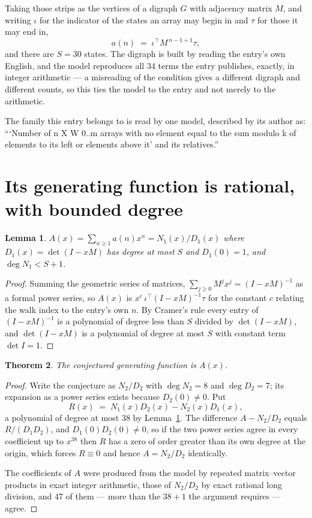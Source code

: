 \documentclass[11pt,a4paper]{article}
\theoremstyle{plain}
\newtheorem{theorem}{Theorem}
\newtheorem{lemma}[theorem]{Lemma}
\theoremstyle{definition}
\begin{document}
Taking those strips as the vertices of a digraph $G$ with adjacency matrix $M$, and writing
$\iota$ for the indicator of the states an array may begin in and $\tau$ for those it may end
in,
\[
a(n)\;=\;\iota^{\!\top}M^{\,n-1+1}\tau ,
\]
and there are $S=30$ states. The digraph is built by reading the entry's own English, and the
model reproduces all $34$ terms the entry publishes, exactly, in integer arithmetic --- a
misreading of the condition gives a different digraph and different counts, so this ties the
model to the entry and not merely to the arithmetic.

The family this entry belongs to is read by one model, described by its author as: ```Number of n X W 0..m arrays with no element equal to the sum modulo k of elements to its left or elements above it' and its relatives.''


\section{Its generating function is rational, with bounded degree}

\begin{lemma}\label{lem:rat}
$A(x)=\sum_{n\ge1}a(n)x^n=N_1(x)/D_1(x)$ where $D_1(x)=\det(I-xM)$ has degree at most
$S$ and $D_1(0)=1$, and $\deg N_1<S+1$.
\end{lemma}

\begin{proof}
Summing the geometric series of matrices, $\sum_{j\ge0}M^jx^j=(I-xM)^{-1}$ as a formal
power series, so $A(x)$ is $x^{c}\,\iota^{\!\top}(I-xM)^{-1}\tau$ for the constant $c$
relating the walk index to the entry's own $n$. By Cramer's rule every entry of
$(I-xM)^{-1}$ is a polynomial of degree less than $S$ divided by $\det(I-xM)$, and
$\det(I-xM)$ is a polynomial of degree at most $S$ with constant term $\det I=1$.
\end{proof}

\begin{theorem}
The conjectured generating function is $A(x)$.
\end{theorem}

\begin{proof}
Write the conjecture as $N_2/D_2$ with $\deg N_2=8$ and $\deg D_2=7$; its expansion as a
power series exists because $D_2(0)\neq0$. Put
\[
R(x)\;=\;N_1(x)D_2(x)-N_2(x)D_1(x),
\]
a polynomial of degree at most $38$ by Lemma~\ref{lem:rat}. The difference
$A-N_2/D_2$ equals $R/(D_1D_2)$, and $D_1(0)D_2(0)\neq0$, so if the two power series agree in
every coefficient up to $x^{38}$ then $R$ has a zero of order greater than its own
degree at the origin, which forces $R\equiv0$ and hence $A=N_2/D_2$ identically.

The coefficients of $A$ were produced from the model by repeated matrix--vector products in
exact integer arithmetic, those of $N_2/D_2$ by exact rational long division, and $47$
of them --- more than the $38+1$ the argument requires --- agree.
\end{proof}
\end{document}

